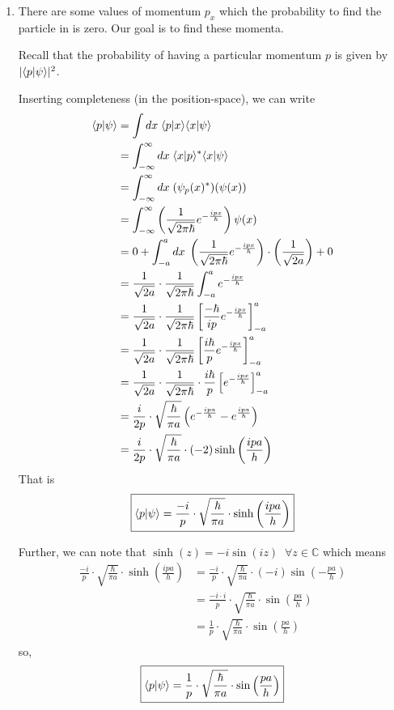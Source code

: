 \documentclass[twoside]{article}
\begin{document}
\begin{enumerate}
   \item There are some values of momentum $p_x$ which the probability to find the particle in is zero. Our goal is to find these momenta.
   
   Recall that  the probability of having a particular momentum $p$ is given by $|\langle p | \psi \rangle|^2$. 
   
   Inserting completeness (in the position-space), we can write
   \begin{align*}
      \langle p | \psi \rangle &= \int dx\; \langle p | x \rangle \langle x | \psi \rangle \\
                          &= \int_{-\infty}^{\infty} dx\; \langle x | p \rangle^{*} \langle x | \psi \rangle \\
                          &= \int_{-\infty}^{\infty} dx\; (\psi_p(x)^{*})(\psi(x)) \\
                          &= \int_{-\infty}^{\infty} \left( \frac{1}{\sqrt{2\pi\hbar}} e^{-\frac{ipx}{\hbar}} \right) \psi(x) \\
                          &= 0 + \int_{-a}^{a} dx\; \left( \frac{1}{\sqrt{2\pi\hbar}} e^{-\frac{ipx}{\hbar}} \right) \cdot \left(\frac{1}{\sqrt{2a}}\right) + 0 \\
                          &= \frac{1}{\sqrt{2a}} \cdot \frac{1}{\sqrt{2\pi\hbar}} \int_{-a}^{a} e^{-\frac{ipx}{\hbar}} \\
                          &= \frac{1}{\sqrt{2a}} \cdot \frac{1}{\sqrt{2\pi\hbar}} \left[ \frac{-\hbar}{ip} e^{-\frac{ipx}{\hbar}} \right]_{-a}^{a} \\
                          &= \frac{1}{\sqrt{2a}} \cdot \frac{1}{\sqrt{2\pi\hbar}} \left[ \frac{i\hbar}{p} e^{-\frac{ipx}{\hbar}} \right]_{-a}^{a} \\
                          &= \frac{1}{\sqrt{2a}} \cdot \frac{1}{\sqrt{2\pi\hbar}} \cdot  \frac{i\hbar}{p} \left[e^{-\frac{ipx}{\hbar}} \right]_{-a}^{a} \\
                          &= \frac{i}{2p} \cdot \sqrt{\frac{\hbar}{\pi a}} \left( e^{-\frac{ipa}{\hbar}} -  e^{\frac{ipa}{\hbar}} \right) \\
                          &= \frac{i}{2p} \cdot \sqrt{\frac{\hbar}{\pi a}}\cdot (-2)\sinh\left(\frac{ipa}{h}\right)
   \end{align*}
   That is 
   \[ \boxed{\langle p | \psi \rangle =  \frac{-i}{p} \cdot \sqrt{\frac{\hbar}{\pi a}}\cdot \sinh\left(\frac{ipa}{h}\right) } \]

   Further, we can note that $\sinh(z) = -i\sin(iz)\;\; \forall z \in \mathbb{C}$ which means
   \begin{align*}
      \frac{-i}{p} \cdot \sqrt{\frac{\hbar}{\pi a}}\cdot \sinh\left(\frac{ipa}{h}\right) &= \frac{-i}{p} \cdot \sqrt{\frac{\hbar}{\pi a}}\cdot (-i)\sin\left(-\frac{pa}{h}\right) \\
              &= \frac{-i \cdot i}{p} \cdot \sqrt{\frac{\hbar}{\pi a}}\cdot \sin\left(\frac{pa}{h}\right) \\
              &= \frac{1}{p} \cdot \sqrt{\frac{\hbar}{\pi a}}\cdot \sin\left(\frac{pa}{h}\right) 
   \end{align*}
   so, 
   \[ \boxed{\langle p | \psi \rangle = \frac{1}{p} \cdot \sqrt{\frac{\hbar}{\pi a}}\cdot \sin\left(\frac{pa}{h}\right)  } \]


\end{enumerate}
\end{document}

